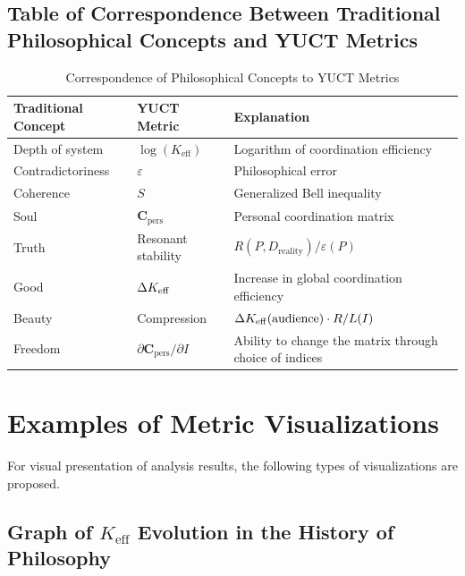 \documentclass[12pt,a4paper]{article}
\newcommand{\eps}{\varepsilon}
\newcommand{\Cpers}{\mathbf{C}_{\text{pers}}}
\begin{document}
	\subsection{Table of Correspondence Between Traditional Philosophical Concepts and YUCT Metrics}
	
	\begin{table}[H]
		\centering
		\caption{Correspondence of Philosophical Concepts to YUCT Metrics}
		\label{tab:philosophy-metrics}
		\begin{tabular}{p{3.5cm}p{3.5cm}p{4cm}}
			\toprule
			\textbf{Traditional Concept} & \textbf{YUCT Metric} & \textbf{Explanation} \\
			\midrule
			Depth of system & \(\log(K_{\mathrm{eff}})\) & Logarithm of coordination efficiency \\
			Contradictoriness & \(\eps\) & Philosophical error \\
			Coherence & \(S\) & Generalized Bell inequality \\
			Soul & \(\Cpers\) & Personal coordination matrix \\
			Truth & Resonant stability & \(R(P, D_{\text{reality}}) / \eps(P)\) \\
			Good & \(\Delta \Keff\) & Increase in global coordination efficiency \\
			Beauty & Compression & \( \Delta \Keff(\text{audience}) \cdot R / L(I) \) \\
			Freedom & \(\partial \Cpers / \partial I\) & Ability to change the matrix through choice of indices \\
			\bottomrule
		\end{tabular}
	\end{table}
	
	\section{Examples of Metric Visualizations}
	\label{sec:visualizations}
	
	For visual presentation of analysis results, the following types of visualizations are proposed.
	
	\subsection{Graph of \(K_{\mathrm{eff}}\) Evolution in the History of Philosophy}
	
\end{document}
